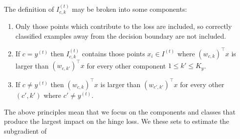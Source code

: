 \documentclass{article}
\begin{document}
The definition of $I_{c,k}^{(t)}$ may be broken into some components:
\begin{enumerate}
\item Only those points which contribute to the loss are included, 
so correctly classified examples away from the decision boundary
are not included.
\item If $c=y^{(t)}$ then $I_{c,k}^{(t)}$ contains those points $x_i\in I^{(t)}$ where
$(w_{c,k})^\top x$ is larger than 
$(w_{c,k'})^\top x$ for every other component $1\leq k'\leq K_y$.
\item If $c\neq y^{(t)}$ then $(w_{c,k})^\top x$ is larger than $(w_{c',k'})^\top x$ for every
other $(c',k')$ where $c'\neq y^{(t)}$.
\end{enumerate}
The above principles mean that we focus on the components and 
classes that produce the largest impact on the hinge loss.
We these sets to estimate the subgradient of
\end{document}
